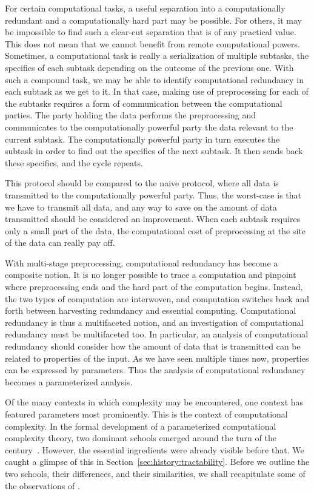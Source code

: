 For certain computational tasks, a useful separation into a computationally redundant and a computationally hard part may be possible.
For others, it may be impossible to find such a clear-cut separation that is of any practical value.
This does not mean that we cannot benefit from remote computational powers.
Sometimes, a computational task is really a serialization of multiple subtasks, the specifics of each subtask depending on the outcome of the previous one.
With such a compound task, we may be able to identify computational redundancy in each subtask as we get to it.
In that case, making use of preprocessing for each of the subtasks requires a form of communication between the computational parties.
The party holding the data performs the preprocessing and communicates to the computationally powerful party the data relevant to the current subtask.
The computationally powerful party in turn executes the subtask in order to find out the specifics of the next subtask.
It then sends back these specifics, and the cycle repeats.

This protocol should be compared to the naive protocol, where all data is transmitted to the computationally powerful party.
Thus, the worst-case is that we have to transmit all data, and any way to save on the amount of data transmitted should be considered an improvement.
When each subtask requires only a small part of the data, the computational cost of preprocessing at the site of the data can really pay off.

With multi-stage preprocessing, computational redundancy has become a composite notion.
It is no longer possible to trace a computation and pinpoint where preprocessing ends and the hard part of the computation begins.
Instead, the two types of computation are interwoven, and computation switches back and forth between harvesting redundancy and essential computing.
Computational redundancy is thus a multifaceted notion, and an investigation of computational redundancy must be multifaceted too.
In particular, an analysis of computational redundancy should consider how the amount of data that is transmitted can be related to properties of the input.
As we have seen multiple times now, properties can be expressed by parameters.
Thus the analysis of computational redundancy becomes a parameterized analysis.


\label{sec:parameterized_complexity_theory}%

Of the many contexts in which complexity may be encountered, one context has featured parameters most prominently.
This is the context of computational complexity.
In the formal development of a parameterized computational complexity theory, two dominant schools emerged around the turn of the century~\parencite{downey1999parameterized,flum2006parameterized}.
However, the essential ingredients were already visible before that.
We caught a glimpse of this in Section~\ref{sec:history:tractability}.
Before we outline the two schools, their differences, and their similarities, we shall recapitulate some of the observations of \textcite{garey1979computers}.

